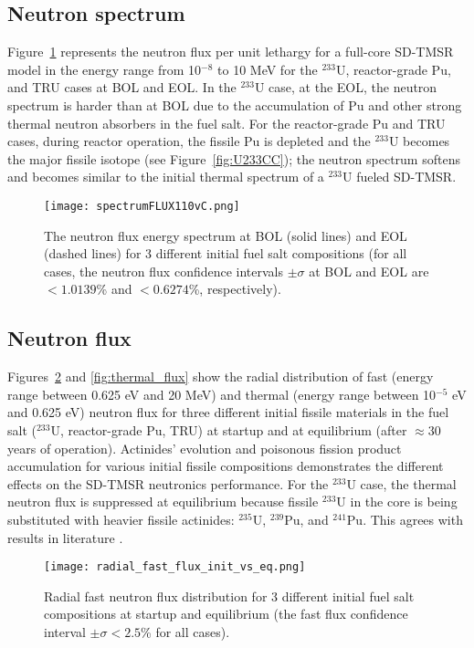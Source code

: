 \subsection{Neutron spectrum}
Figure~\ref{fig:spectrumFLUX110vC} represents the neutron flux per unit 
lethargy for a full-core SD-TMSR model in the energy range from 10$^{-8}$ to 
10 MeV for the $^{233}$U, reactor-grade Pu, and TRU cases at BOL and EOL. In 
the $^{233}$U case, at the EOL, the neutron spectrum is harder than at BOL due 
to the accumulation of Pu and other strong thermal neutron absorbers in the 
fuel salt. For the reactor-grade Pu and TRU cases, during reactor operation, 
the fissile Pu is depleted and the $^{233}$U becomes the major fissile isotope 
(see Figure~\ref{fig:U233CC}); the neutron spectrum softens and becomes 
similar to the initial thermal spectrum of a $^{233}$U fueled SD-TMSR.
 \begin{figure}
 	\centering
 	\texttt{[image: spectrumFLUX110vC.png]}
 			\vspace{-0.4in}
 	\caption{The neutron flux energy spectrum at BOL (solid lines) and EOL (dashed lines) for 3 different initial 
 		fuel salt compositions (for all cases, the neutron flux
 		confidence intervals $\pm\sigma$ at BOL and EOL are $<1.0139$\% and $<0.6274$\%, respectively).}
 	\label{fig:spectrumFLUX110vC}
\end{figure}

\subsection{Neutron flux}
Figures~\ref{fig:fast_flux} and \ref{fig:thermal_flux} show the radial 
distribution of fast (energy range between 0.625 eV and 20 MeV) and thermal 
(energy range between 10$^{-5}$ eV and 0.625 eV) neutron flux for three 
different initial fissile materials in the fuel salt ($^{233}$U, reactor-grade 
Pu, TRU) at startup and at equilibrium (after $\approx 30$ years of 
operation). Actinides' evolution and poisonous fission product accumulation 
for various initial fissile compositions demonstrates the different effects on 
the SD-TMSR neutronics performance. For the $^{233}$U case, the thermal 
neutron flux is suppressed at equilibrium because fissile $^{233}$U in the 
core is being substituted with heavier fissile actinides: $^{235}$U, 
$^{239}$Pu, and $^{241}$Pu. This agrees with results in literature 
\cite{rykhlevskii2019modeling, ashraf2019whole_core}.
\begin{figure}[htp!] %
	\texttt{[image: radial\_fast\_flux\_init\_vs\_eq.png]} 
	\caption{Radial fast neutron flux distribution for 3 different initial 
		fuel salt compositions at startup and equilibrium (the fast flux 
		confidence interval $\pm\sigma<2.5$\% for all cases).}
	\label{fig:fast_flux}
\end{figure}

